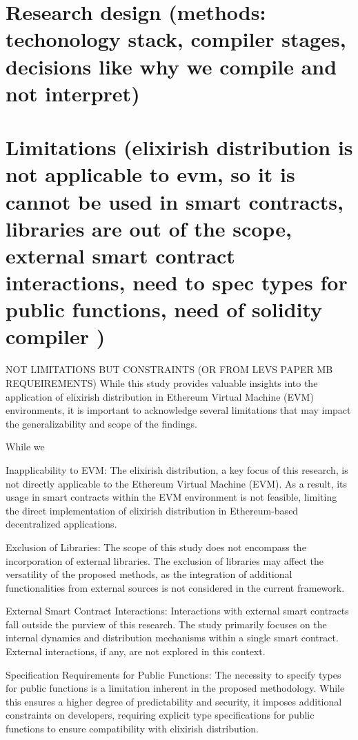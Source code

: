\section{Research design (methods: techonology stack, compiler stages, decisions like why we compile and not interpret)}
\label{}

\section{Limitations (elixirish distribution is not applicable to evm, so it is cannot be used in smart contracts, libraries are out of the scope, external smart contract interactions, need to spec types for public functions, need of solidity compiler )}
\label{}
NOT LIMITATIONS BUT CONSTRAINTS (OR FROM LEVS PAPER MB REQUEIREMENTS)
While this study provides valuable insights into the application of elixirish distribution in Ethereum Virtual Machine (EVM) environments, it is important to acknowledge several limitations that may impact the generalizability and scope of the findings.

While we 

Inapplicability to EVM:
The elixirish distribution, a key focus of this research, is not directly applicable to the Ethereum Virtual Machine (EVM). As a result, its usage in smart contracts within the EVM environment is not feasible, limiting the direct implementation of elixirish distribution in Ethereum-based decentralized applications.

Exclusion of Libraries:
The scope of this study does not encompass the incorporation of external libraries. The exclusion of libraries may affect the versatility of the proposed methods, as the integration of additional functionalities from external sources is not considered in the current framework.

External Smart Contract Interactions:
Interactions with external smart contracts fall outside the purview of this research. The study primarily focuses on the internal dynamics and distribution mechanisms within a single smart contract. External interactions, if any, are not explored in this context.

Specification Requirements for Public Functions:
The necessity to specify types for public functions is a limitation inherent in the proposed methodology. While this ensures a higher degree of predictability and security, it imposes additional constraints on developers, requiring explicit type specifications for public functions to ensure compatibility with elixirish distribution.

